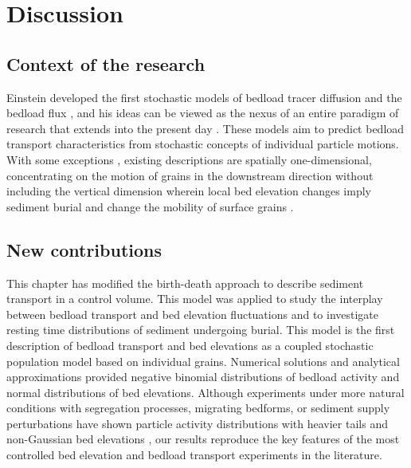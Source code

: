\section{Discussion}
\label{sec:elediscussion}

\subsection{Context of the research}
Einstein developed the first stochastic models of bedload tracer diffusion \citep{Einstein1937} and the bedload flux \citep{Einstein1950}, and his ideas can be viewed as the nexus of an entire paradigm of research that extends into the present day \citep[e.g.,][]{Hubbell1964, Nakagawa1976,Hassan1991,Ancey2008, Wu2019}.
These models aim to predict bedload transport characteristics from stochastic concepts of individual particle motions.
With some exceptions \citep{Yang1971,Nakagawa1980,Pelosi2016,Wu2019,Wu2019a}, existing descriptions are spatially one-dimensional, concentrating on the motion of grains in the downstream direction without including the vertical dimension wherein local bed elevation changes imply sediment burial \citep{Voepel2013,Martin2014} and change the mobility of surface grains \citep{Yang1971,Nakagawa1980}.

\subsection{New contributions}

This chapter has modified the birth-death approach to describe sediment transport in a control volume. This model was applied to study the interplay between bedload transport and bed elevation fluctuations and to investigate resting time distributions of sediment undergoing burial.
This model is the first description of bedload transport and bed elevations as a coupled stochastic population model based on individual grains.
Numerical solutions and analytical approximations provided negative binomial distributions of bedload activity and normal distributions of bed elevations.
Although experiments under more natural conditions with segregation processes,  migrating bedforms, or sediment supply perturbations have shown particle activity distributions with heavier tails \citep{Dhont2018,Saletti2015} and non-Gaussian bed elevations \citep{Singh2012,Aberle2006}, our results reproduce the key features of the most controlled bed elevation \citep{Wong2007,Martin2014} and bedload transport \citep{Heyman2016,Ancey2008} experiments in the literature.

